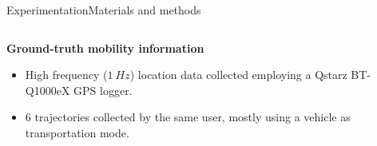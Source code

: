 \begin{frame}{Experimentation}{Materials and methods}
\small 
\vspace{-0.5cm}
\begin{columns}
\begin{column}[T]{0.55\textwidth}
\begin{block}{\small \textbf{Ground-truth mobility information}}
  \begin{itemize}
    \item High frequency ($1~Hz$) location data collected employing a Qstarz BT-Q1000eX GPS logger.
    \item 6 trajectories collected by the same user, mostly using a vehicle as transportation mode.
  \end{itemize}
\end{block}
\end{column}

\begin{column}[T]{0.45\textwidth}
\begin{table}
\centering
\renewcommand{\arraystretch}{0.6}
\caption{Input parameters for the discovery of ground truth mobility information.}
\label{tab:exp-gt-input-parameters}
\end{table}
\end{column}
\end{columns}

\begin{table}
\centering
\renewcommand{\arraystretch}{0.8}
\end{table}
\end{frame}
